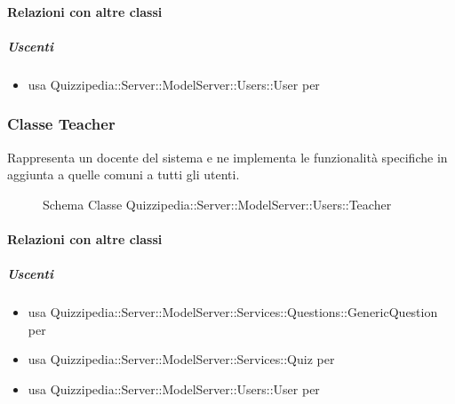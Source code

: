 \paragraph{Relazioni con altre classi}
\subparagraph{Uscenti}
\begin{itemize}
\item usa Quizzipedia::Server::ModelServer::Users::User per 
\end{itemize}
\subsubsection{Classe Teacher}
Rappresenta un docente del sistema e ne implementa le funzionalità specifiche in aggiunta a quelle comuni a tutti gli utenti.
\begin{figure}[H]
\centering
\noindent{}
\caption[Schema Classe Teacher]{Schema Classe Quizzipedia::Server::ModelServer::Users::Teacher}
\end{figure}
\paragraph{Relazioni con altre classi}
\subparagraph{Uscenti}
\begin{itemize}
\item usa Quizzipedia::Server::ModelServer::Services::Questions::GenericQuestion per 
\item usa Quizzipedia::Server::ModelServer::Services::Quiz per 
\item usa Quizzipedia::Server::ModelServer::Users::User per 
\end{itemize}
